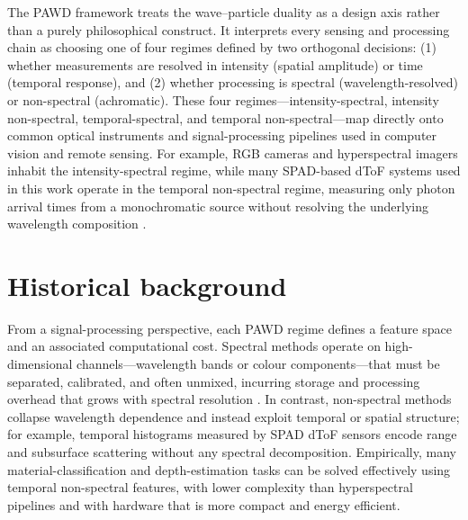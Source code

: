 \documentclass[12pt,a4paper,oneside]{report}
\let\oldsection\section
\renewcommand{\section}{\clearpage\oldsection}
\begin{document}
The PAWD framework treats the wave–particle duality as a design axis rather than a purely philosophical construct. It interprets every sensing and processing chain as choosing one of four regimes defined by two orthogonal decisions: (1) whether measurements are resolved in intensity (spatial amplitude) or time (temporal response), and (2) whether processing is spectral (wavelength-resolved) or non-spectral (achromatic). These four regimes—intensity-spectral, intensity non-spectral, temporal-spectral, and temporal non-spectral—map directly onto common optical instruments and signal-processing pipelines used in computer vision and remote sensing. For example, RGB cameras and hyperspectral imagers inhabit the intensity-spectral regime, while many SPAD-based dToF systems used in this work operate in the temporal non-spectral regime, measuring only photon arrival times from a monochromatic source without resolving the underlying wavelength composition \cite{su2016}.

\begin{quote}
    \footnotesize
    \ttfamily
    \color{textgrey}%
    \quotefive
    \end{quote}
    

\section{Historical background}
\label{sec:historical_background}

From a signal-processing perspective, each PAWD regime defines a feature space and an associated computational cost. Spectral methods operate on high-dimensional channels—wavelength bands or colour components—that must be separated, calibrated, and often unmixed, incurring storage and processing overhead that grows with spectral resolution \cite{su2016,becker2023}. In contrast, non-spectral methods collapse wavelength dependence and instead exploit temporal or spatial structure; for example, temporal histograms measured by SPAD dToF sensors encode range and subsurface scattering without any spectral decomposition. Empirically, many material-classification and depth-estimation tasks can be solved effectively using temporal non-spectral features, with lower complexity than hyperspectral pipelines and with hardware that is more compact and energy efficient.
\end{document}
